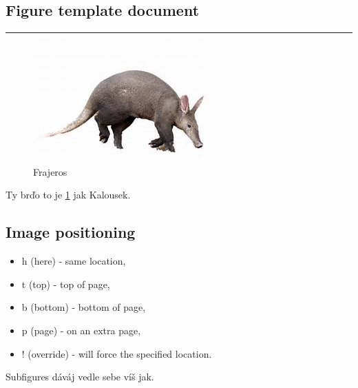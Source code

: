 \documentclass{article}
\begin{document}
	
	\begin{center}
		\section*{Figure template document}
		\noindent\rule{15cm}{1.4pt}
	\end{center}
	
	\begin{figure}[h!]
		\includegraphics[width=\linewidth]{images/frajer.jpeg}
		\caption{Frajeros}
		\label{fig:frajer}
	\end{figure}
	
	Ty brďo to je \ref{fig:frajer} jak Kalousek.
	
	\subsection*{Image positioning}
		\begin{itemize}
			\item h (here) - same location,
			
			\item t (top) - top of page,
			
			\item b (bottom) - bottom of page,
			
			\item p (page) - on an extra page,
			
			\item ! (override) - will force the specified location.
		\end{itemize}
	\newpage
	
	Subfigures dáváj vedle sebe víš jak.
	
\end{document}
